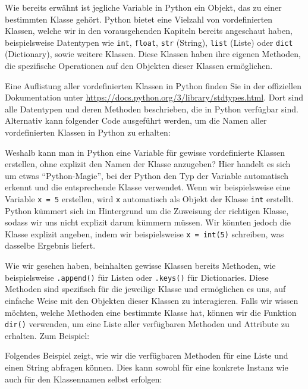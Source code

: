 Wie bereits erwähnt ist jegliche Variable in Python ein Objekt, das zu einer bestimmten Klasse gehört. Python bietet eine Vielzahl von vordefinierten Klassen, welche wir in den vorausgehenden Kapiteln bereits angeschaut haben, beispielsweise Datentypen wie \lstinline|int|, \lstinline|float|, \lstinline|str| (String), \lstinline|list| (Liste) oder \lstinline|dict| (Dictionary), sowie weitere Klassen. Diese Klassen haben ihre eigenen Methoden, die spezifische Operationen auf den Objekten dieser Klassen ermöglichen.

\begin{myremark}
	Eine Auflistung aller vordefinierten Klassen in Python finden Sie in der offiziellen Dokumentation unter \url{https://docs.python.org/3/library/stdtypes.html}. Dort sind alle Datentypen und deren Methoden beschrieben, die in Python verfügbar sind. Alternativ kann folgender Code ausgeführt werden, um die Namen aller vordefinierten Klassen in Python zu erhalten:
	
\end{myremark}

Weshalb kann man in Python eine Variable für gewisse vordefinierte Klassen erstellen, ohne explizit den Namen der Klasse anzugeben? Hier handelt es sich um etwas \enquote{Python-Magie}, bei der Python den Typ der Variable automatisch erkennt und die entsprechende Klasse verwendet. Wenn wir beispielsweise eine Variable \lstinline|x = 5| erstellen, wird \lstinline|x| automatisch als Objekt der Klasse \lstinline|int| erstellt. Python kümmert sich im Hintergrund um die Zuweisung der richtigen Klasse, sodass wir uns nicht explizit darum kümmern müssen. Wir könnten jedoch die Klasse explizit angeben, indem wir beispielsweise \lstinline|x = int(5)| schreiben, was dasselbe Ergebnis liefert.

Wie wir gesehen haben, beinhalten gewisse Klassen bereits Methoden, wie beispielsweise \lstinline|.append()| für Listen oder \lstinline|.keys()| für Dictionaries. Diese Methoden sind spezifisch für die jeweilige Klasse und ermöglichen es uns, auf einfache Weise mit den Objekten dieser Klassen zu interagieren. Falls wir wissen möchten, welche Methoden eine bestimmte Klasse hat, können wir die Funktion \lstinline|dir()| verwenden, um eine Liste aller verfügbaren Methoden und Attribute zu erhalten. Zum Beispiel:

\begin{myexample} Folgendes Beispiel zeigt, wie wir die verfügbaren Methoden für eine Liste und einen String abfragen können. Dies kann sowohl für eine konkrete Instanz wie auch für den Klassennamen selbst erfolgen:

\end{myexample}

